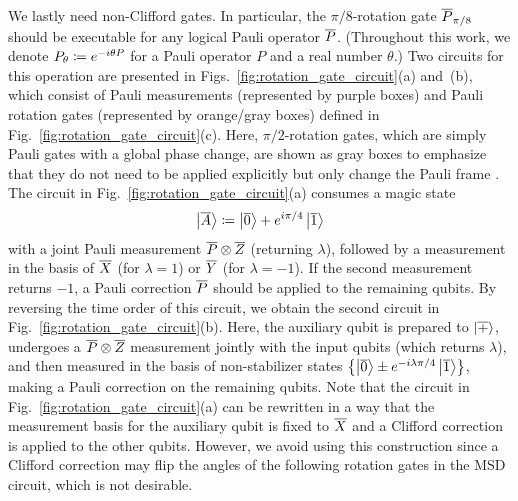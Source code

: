 \documentclass[
 prx,
 reprint,
 superscriptaddress,
 longbibliography,
 dvipsnames
]{revtex4-2}
\begin{document}
We lastly need non-Clifford gates.
In particular, the $\pi/8$-rotation gate $\overline{P}_{\pi/8}$ should be executable for any logical Pauli operator $\overline{P}$.
(Throughout this work, we denote $P_{\theta} \coloneqq e^{-i\theta P}$ for a Pauli operator $P$ and a real number $\theta$.)
Two circuits for this operation \cite{litinski2019game,litinski2019magic} are presented in Figs.~\ref{fig:rotation_gate_circuit}(a) and~(b), which consist of Pauli measurements (represented by purple boxes) and Pauli rotation gates (represented by orange/gray boxes) defined in Fig.~\ref{fig:rotation_gate_circuit}(c).
Here, $\pi/2$-rotation gates, which are simply Pauli gates with a global phase change, are shown as gray boxes to emphasize that they do not need to be applied explicitly but only change the Pauli frame \cite{knill2005quantum}.
The circuit in Fig.~\ref{fig:rotation_gate_circuit}(a) consumes a magic state
\begin{align}
    \ket{\overline{A}} \coloneqq \ket{\overline{0}} + e^{i\pi/4} \ket{\overline{1}} \label{eq:magic_state}
\end{align}
with a joint Pauli measurement $\overline{P} \otimes \overline{Z}$ (returning $\lambda$), followed by a measurement in the basis of $\overline{X}$ (for $\lambda = 1$) or $\overline{Y}$ (for $\lambda = -1$).
If the second measurement returns $-1$, a Pauli correction $\overline{P}$ should be applied to the remaining qubits.
By reversing the time order of this circuit, we obtain the second circuit in Fig.~\ref{fig:rotation_gate_circuit}(b).
Here, the auxiliary qubit is prepared to $\ket{\overline{+}}$, undergoes a $\overline{P} \otimes \overline{Z}$ measurement jointly with the input qubits (which returns $\lambda$), and then measured in the basis of non-stabilizer states $\qty{\ket{\overline{0}} \pm e^{-i\lambda\pi/4}\ket{\overline{1}}}$, making a Pauli correction on the remaining qubits.
Note that the circuit in Fig.~\ref{fig:rotation_gate_circuit}(a) can be rewritten in a way that the measurement basis for the auxiliary qubit is fixed to $\overline{X}$ and a Clifford correction is applied to the other qubits.
However, we avoid using this construction since a Clifford correction may flip the angles of the following rotation gates in the MSD circuit, which is not desirable.
\end{document}
